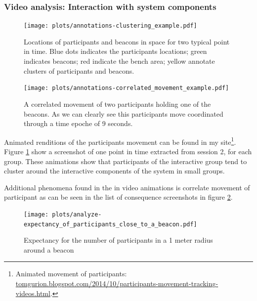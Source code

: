 \documentclass[a4paper,11pt]{article}
\begin{document}
{\subsubsection{Video analysis: Interaction with system components}\label{results:system}

\begin{figure}[!htb]
    \centering
    \texttt{[image: plots/annotations-clustering\_example.pdf]}
    \caption{Locations of participants and beacons in space for two typical point in time. Blue dots indicates the participants locations; green indicates beacons; red indicate the bench area; yellow annotate clusters of participants and beacons.}\label{plot:annotations-clustering_example}
\end{figure}

\begin{figure}[!htb]
    \centering
    \texttt{[image: plots/annotations-correlated\_movement\_example.pdf]}
    \caption{A correlated movement of two participants holding one of the beacons. As we can clearly see this participants move coordinated through a time epoche of 9 seconds.}\label{plot:annotations-correlated_movement_example}
\end{figure}

Animated renditions of the participants movement can be found in my site\footnote{Animated movement of participants: \href{http://tomgurion.blogspot.com/2014/10/participants-movement-tracking-videos.html}{tomgurion.blogspot.com/2014/10/participants-movement-tracking-videos.html}.}.
Figure \ref{plot:annotations-clustering_example} show a screenshot of one point in time extracted from session 2, for each group.
These animations show that participants of the interactive group tend to cluster around the interactive components of the system in small groups.

Additional phenomena found in the in video animations is correlate movement of participant as can be seen in the list of consequence screenshots in figure \ref{plot:annotations-correlated_movement_example}.

\begin{figure}[!htb]
    \centering
    \texttt{[image: plots/analyze-expectancy\_of\_participants\_close\_to\_a\_beacon.pdf]}
    \caption{Expectancy for the number of participants in a 1 meter radius around a beacon}\label{plot:analyze-expectancy_of_participants_close_to_a_beacon}
\end{figure}

}
\end{document}

